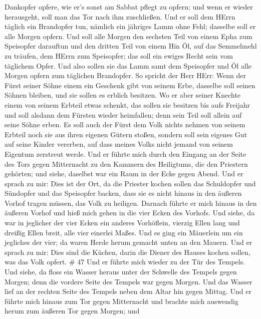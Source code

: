 Dankopfer opfere, wie er's sonst am Sabbat pflegt zu opfern; und wenn er
wieder herausgeht, soll man das Tor nach ihm zuschließen. 
Und er soll dem HErrn täglich ein Brandopfer tun, nämlich ein jähriges
Lamm ohne Fehl; dasselbe soll er alle Morgen opfern.  Und
soll alle Morgen den sechsten Teil von einem Epha zum Speisopfer
darauftun und den dritten Teil von einem Hin Öl, auf das Semmelmehl zu
träufen, dem HErrn zum Speisopfer; das soll ein ewiges Recht sein vom
täglichem Opfer.  Und also sollen sie das Lamm samt dem
Speisopfer und Öl alle Morgen opfern zum täglichen Brandopfer.
 So spricht der Herr HErr: Wenn der Fürst seiner Söhne
einem ein Geschenk gibt von seinem Erbe, dasselbe soll seinen Söhnen
bleiben, und sie sollen es erblich besitzen.  Wo er aber
seiner Knechte einem von seinem Erbteil etwas schenkt, das sollen sie
besitzen bis aufs Freijahr und soll alsdann dem Fürsten wieder
heimfallen; denn sein Teil soll allein auf seine Söhne erben.
 Es soll auch der Fürst dem Volk nichts nehmen von seinem
Erbteil noch sie aus ihren eigenen Gütern stoßen, sondern soll sein
eigenes Gut auf seine Kinder vererben, auf dass meines Volks nicht
jemand von seinem Eigentum zerstreut werde.  Und er führte
mich durch den Eingang an der Seite des Tors gegen Mitternacht zu den
Kammern des Heiligtums, die den Priestern gehörten; und siehe, daselbst
war ein Raum in der Ecke gegen Abend.  Und er sprach zu
mir: Dies ist der Ort, da die Priester kochen sollen das Schuldopfer und
Sündopfer und das Speisopfer backen, dass sie es nicht hinaus in den
äußeren Vorhof tragen müssen, das Volk zu heiligen. 
Darnach führte er mich hinaus in den äußeren Vorhof und hieß mich gehen
in die vier Ecken des Vorhofs.  Und siehe, da war in
jeglicher der vier Ecken ein anderes Vorhöflein, vierzig Ellen lang und
dreißig Ellen breit, alle vier einerlei Maßes.  Und es ging
ein Mäuerlein um ein jegliches der vier; da waren Herde herum gemacht
unten an den Mauern.  Und er sprach zu mir: Dies sind die
Küchen, darin die Diener des Hauses kochen sollen, was das Volk opfert.
\# 47  Und er führte mich wieder zu der Tür des Tempels. Und
siehe, da floss ein Wasser heraus unter der Schwelle des Tempels gegen
Morgen; denn die vordere Seite des Tempels war gegen Morgen. Und das
Wasser lief an der rechten Seite des Tempels neben dem Altar hin gegen
Mittag.  Und er führte mich hinaus zum Tor gegen Mitternacht
und brachte mich auswendig herum zum äußeren Tor gegen Morgen; und
